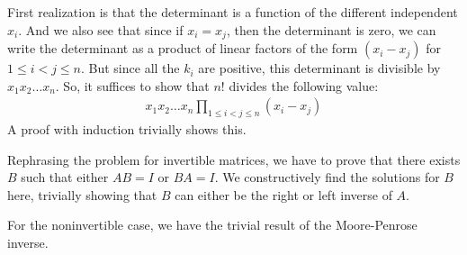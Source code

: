 \documentclass{report}
\begin{document}
\sol First realization is that the determinant is a function of the different independent $x_i$. And we also see that since if $x_i = x_j$, then the determinant is zero, we can write the determinant as a product of linear factors of the form $(x_i - x_j)$ for $1 \leq i < j \leq n$. But since all the $k_i$ are positive, this determinant is divisible by $x_1x_2\ldots x_n$. So, it suffices to show that $n!$ divides the following value:
\begin{align*}
    x_1x_2\ldots x_n \prod_{1 \leq i < j \leq n} (x_i - x_j)
\end{align*}
A proof with induction trivially shows this.

\sol Rephrasing the problem for invertible matrices, we have to prove that there exists $B$ such that either $AB = I$ or $BA = I$. We constructively find the solutions for $B$ here, trivially showing that $B$ can either be the right or left inverse of $A$.

For the noninvertible case, we have the trivial result of the Moore-Penrose inverse.
\end{document}
